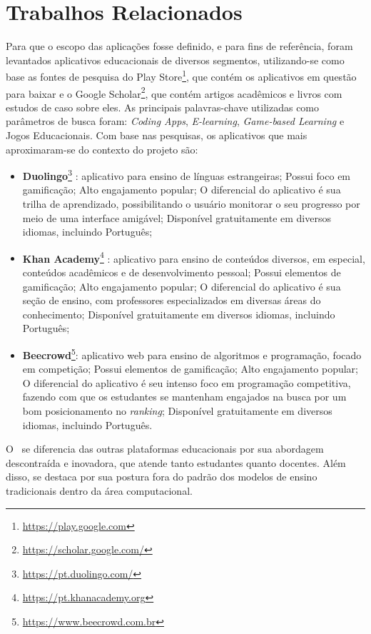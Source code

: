 \section{Trabalhos Relacionados}
Para que o escopo das aplicações fosse definido, e para fins de referência, foram levantados aplicativos educacionais de diversos segmentos, utilizando-se como base as fontes de pesquisa do Play Store\footnote{\url{https://play.google.com}}, que contém os aplicativos em questão para baixar e o Google Scholar\footnote{\url{https://scholar.google.com/}}, que contém artigos acadêmicos e livros com estudos de caso sobre eles. As principais palavras-chave utilizadas como parâmetros de busca foram: \textit{Coding Apps}, \textit{E-learning}, \textit{Game-based Learning} e Jogos Educacionais. Com base nas pesquisas, os aplicativos que mais aproximaram-se do contexto do projeto são:

\begin{itemize}
  \item \textbf{Duolingo}\footnote{\url{https://pt.duolingo.com/}} \cite{duolingo}: aplicativo para ensino de línguas estrangeiras; Possui foco em gamificação; Alto engajamento popular; O diferencial do aplicativo é sua trilha de aprendizado, possibilitando o usuário monitorar o seu progresso por meio de uma interface amigável; Disponível gratuitamente em diversos idiomas, incluindo Português;
  \item \textbf{Khan Academy}\footnote{\url{https://pt.khanacademy.org}} \cite{khan_academy}: aplicativo para ensino de conteúdos diversos, em especial, conteúdos acadêmicos e de desenvolvimento pessoal; Possui elementos de gamificação; Alto engajamento popular; O diferencial do aplicativo é sua seção de ensino, com professores especializados em diversas áreas do conhecimento; Disponível gratuitamente em diversos idiomas, incluindo Português;
  \item \textbf{Beecrowd}\footnote{\url{https://www.beecrowd.com.br}}: aplicativo web para ensino de algoritmos e programação, focado em competição; Possui elementos de gamificação; Alto engajamento popular; O diferencial do aplicativo é seu intenso foco em programação competitiva, fazendo com que os estudantes se mantenham engajados na busca por um bom posicionamento no \textit{ranking}; Disponível gratuitamente em diversos idiomas, incluindo Português.
\end{itemize}

O \appName\ se diferencia das outras plataformas educacionais por sua abordagem descontraída e inovadora, que atende tanto estudantes quanto docentes. Além disso, se destaca por sua postura fora do padrão dos modelos de ensino tradicionais dentro da área computacional.
